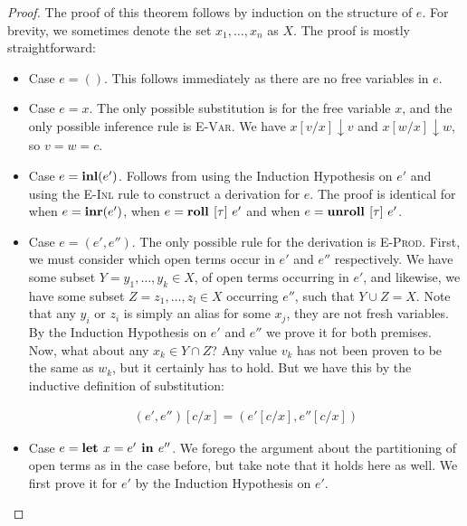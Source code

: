 \begin{proof}

The proof of this theorem follows by induction on the structure of $e$. For
brevity, we sometimes denote the set $x_1, \dots, x_n$ as $X$. The proof is
mostly straightforward:

\begin{itemize}

  \item Case $e = ()$. This follows immediately as there are no free variables
    in $e$.

  \item Case $e = x$. The only possible substitution is for the free variable
    $x$, and the only possible inference rule is \textsc{E-Var}. We have $x[v /
    x] \downarrow v$ and $x[w / x] \downarrow w$, so $v = w = c$.

  \item Case $e = \textbf{inl}(e')$. Follows from using the Induction Hypothesis on
    $e'$ and using the \textsc{E-Inl} rule to construct a derivation for $e$.
    The proof is identical for when $e = \textbf{inr}(e')$, when $e = \textbf{roll } [\tau]\ e'$
    and when $e = \textbf{unroll } [\tau]\ e'$.

  \item Case $e = (e', e'')$. The only possible rule for the derivation is
    \textsc{E-Prod}. First, we must consider which open terms occur in $e'$ and
    $e''$ respectively. We have some subset $Y = y_1, \dots, y_k \in X$, of
    open terms occurring in $e'$, and likewise, we have some subset $Z = z_1,
    \dots, z_l \in X$ occurring $e''$, such that $Y \cup Z = X$. Note that any
    $y_i$ or $z_i$ is simply an alias for some $x_j$, they are not fresh
    variables. By the Induction Hypothesis on $e'$ and $e''$ we prove it for
    both premises. Now, what about any $x_k \in Y \cap Z$? Any value $v_k$ has
    not been proven to be the same as $w_k$, but it certainly has to hold. But
    we have this by the inductive definition of substitution:

    \begin{align*}
      (e', e'') [c / x] = (e' [c / x], e'' [c / x])
    \end{align*}

  \item Case $e = \textbf{let } x = e' \textbf{ in } e''$. We forego the argument about the
    partitioning of open terms as in the case before, but take note that it
    holds here as well. We first prove it for $e'$ by the Induction Hypothesis
    on $e'$.


\end{itemize}
\end{proof}
